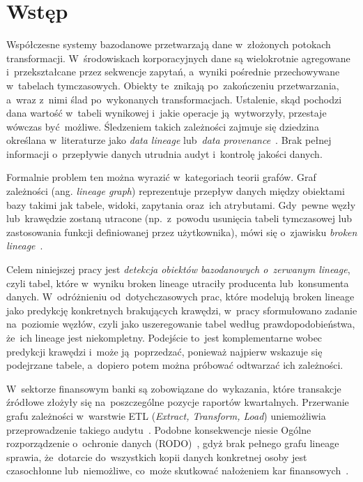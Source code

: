 \documentclass[polish,master,a4paper,oneside]{ppfcmthesis}
\renewcommand{\_}{\origtextunderscore\ifmmode\else\allowbreak\fi}
\begin{document}
\cleardoublepage

\mainmatter*

\chapter{Wstęp}

Współczesne systemy bazodanowe przetwarzają dane w~złożonych potokach
transformacji. W~środowiskach korporacyjnych dane są wielokrotnie
agregowane i~przekształcane przez sekwencje zapytań, a~wyniki pośrednie
przechowywane w~tabelach tymczasowych. Obiekty te~znikają po~zakończeniu
przetwarzania, a~wraz z~nimi ślad po~wykonanych transformacjach. Ustalenie,
skąd pochodzi dana wartość w~tabeli wynikowej i~jakie operacje ją~wytworzyły,
przestaje wówczas być~możliwe. Śledzeniem takich zależności zajmuje się
dziedzina określana w~literaturze jako \emph{data lineage} lub~\emph{data
provenance}~\cite{Psallidas2023,Yamada2023}. Brak pełnej informacji
o~przepływie danych utrudnia audyt i~kontrolę jakości danych.

Formalnie problem ten można wyrazić w~kategoriach teorii grafów. Graf
zależności (ang. \emph{lineage graph}) reprezentuje przepływ danych między
obiektami bazy takimi jak tabele, widoki, zapytania oraz~ich atrybutami.
Gdy~pewne węzły lub~krawędzie zostaną utracone (np.~z~powodu usunięcia
tabeli tymczasowej lub zastosowania funkcji definiowanej przez użytkownika),
mówi się o~zjawisku \emph{broken lineage}~\cite{Boinski2025}.

Celem niniejszej pracy jest \emph{detekcja obiektów bazodanowych o~zerwanym
lineage}, czyli tabel, które w~wyniku broken lineage utraciły producenta
lub~konsumenta danych. W~odróżnieniu od~dotychczasowych prac, które modelują
broken lineage jako predykcję konkretnych brakujących krawędzi, w~pracy
sformułowano zadanie na~poziomie węzłów, czyli jako uszeregowanie tabel według
prawdopodobieństwa, że~ich lineage jest niekompletny. Podejście to~jest
komplementarne wobec predykcji krawędzi i~może ją~poprzedzać, ponieważ
najpierw wskazuje się podejrzane tabele, a~dopiero potem można próbować
odtwarzać ich zależności.

W~sektorze finansowym banki są zobowiązane do~wykazania, które transakcje
źródłowe złożyły się na~poszczególne pozycje raportów kwartalnych. Przerwanie
grafu zależności w~warstwie ETL (\emph{Extract, Transform, Load}) uniemożliwia
przeprowadzenie takiego audytu~\cite{Boinski2025}.
Podobne konsekwencje niesie Ogólne rozporządzenie o~ochronie danych
(RODO)~\cite{RODO2016}, gdyż
brak pełnego grafu lineage sprawia, że~dotarcie do~wszystkich kopii danych
konkretnej osoby jest czasochłonne lub~niemożliwe, co~może skutkować
nałożeniem kar finansowych~\cite{Boinski2025}.
\end{document}
